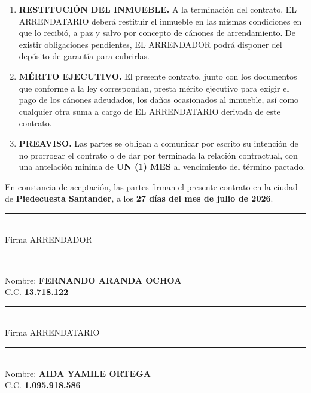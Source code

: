 \documentclass[12pt,letterpaper]{article}
\begin{document}
\begin{enumerate}[label=\textbf{CLÁUSULA \Roman*.}, wide, labelindent=0pt, itemsep=0.4cm]
\item \textbf{RESTITUCIÓN DEL INMUEBLE.} A la terminación del contrato, EL ARRENDATARIO deberá restituir el inmueble en las mismas condiciones en que lo recibió, a paz y salvo por concepto de cánones de arrendamiento. De existir obligaciones pendientes, EL ARRENDADOR podrá disponer del depósito de garantía para cubrirlas.

\item \textbf{MÉRITO EJECUTIVO.} El presente contrato, junto con los documentos que conforme a la ley correspondan, presta mérito ejecutivo para exigir el pago de los cánones adeudados, los daños ocasionados al inmueble, así como cualquier otra suma a cargo de EL ARRENDATARIO derivada de este contrato.

\item \textbf{PREAVISO.} Las partes se obligan a comunicar por escrito su intención de no prorrogar el contrato o de dar por terminada la relación contractual, con una antelación mínima de \textbf{UN (1) MES} al vencimiento del término pactado.

\end{enumerate}

En constancia de aceptación, las partes firman el presente contrato en la ciudad de \textbf{Piedecuesta Santander}, a los \textbf{27 días del mes de julio de 2026}.

\vspace{0.8cm}

\noindent
\begin{minipage}[t]{0.48\textwidth}
\rule{6cm}{0.4pt} \\
Firma \hspace{1.5cm} ARRENDADOR \\[0.3cm]
\rule{6cm}{0.4pt} \\
Nombre: \textbf{FERNANDO ARANDA OCHOA} \\
C.C. \textbf{13.718.122}
\end{minipage}
\hfill
\begin{minipage}[t]{0.48\textwidth}
\rule{6cm}{0.4pt} \\
Firma \hspace{1.5cm} ARRENDATARIO \\[0.3cm]
\rule{6cm}{0.4pt} \\
Nombre: \textbf{AIDA YAMILE ORTEGA} \\
C.C. \textbf{1.095.918.586}
\end{minipage}
\end{document}
